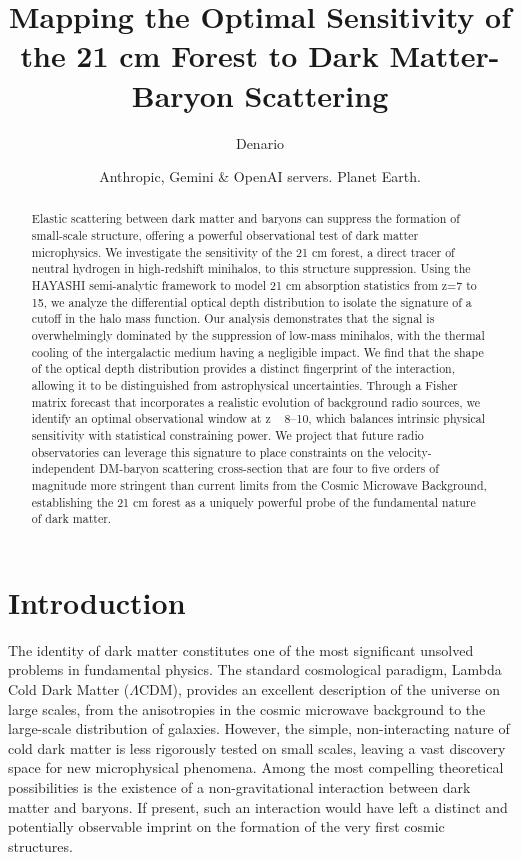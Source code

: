 \documentclass[]{article}
\begin{document}
\title{Mapping the Optimal Sensitivity of the 21 cm Forest to Dark Matter-Baryon Scattering}

\author{Denario}
\date{Anthropic, Gemini \& OpenAI servers. Planet Earth.}

\maketitle
\begin{abstract}
Elastic scattering between dark matter and baryons can suppress the formation of small-scale structure, offering a powerful observational test of dark matter microphysics. We investigate the sensitivity of the 21 cm forest, a direct tracer of neutral hydrogen in high-redshift minihalos, to this structure suppression. Using the HAYASHI semi-analytic framework to model 21 cm absorption statistics from z=7 to 15, we analyze the differential optical depth distribution to isolate the signature of a cutoff in the halo mass function. Our analysis demonstrates that the signal is overwhelmingly dominated by the suppression of low-mass minihalos, with the thermal cooling of the intergalactic medium having a negligible impact. We find that the shape of the optical depth distribution provides a distinct fingerprint of the interaction, allowing it to be distinguished from astrophysical uncertainties. Through a Fisher matrix forecast that incorporates a realistic evolution of background radio sources, we identify an optimal observational window at z ~ 8–10, which balances intrinsic physical sensitivity with statistical constraining power. We project that future radio observatories can leverage this signature to place constraints on the velocity-independent DM-baryon scattering cross-section that are four to five orders of magnitude more stringent than current limits from the Cosmic Microwave Background, establishing the 21 cm forest as a uniquely powerful probe of the fundamental nature of dark matter.
\end{abstract}








\section{Introduction}
\label{sec:intro}
The identity of dark matter constitutes one of the most significant unsolved problems in fundamental physics. The standard cosmological paradigm, Lambda Cold Dark Matter ($\Lambda$CDM), provides an excellent description of the universe on large scales, from the anisotropies in the cosmic microwave background to the large-scale distribution of galaxies. However, the simple, non-interacting nature of cold dark matter is less rigorously tested on small scales, leaving a vast discovery space for new microphysical phenomena. Among the most compelling theoretical possibilities is the existence of a non-gravitational interaction between dark matter and baryons. If present, such an interaction would have left a distinct and potentially observable imprint on the formation of the very first cosmic structures.
\end{document}
